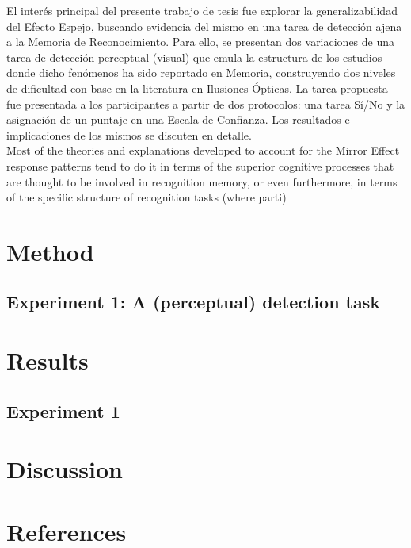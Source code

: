 \documentclass[jou,apacite]{apa6}
\begin{document}
El interés principal del presente trabajo de tesis fue explorar la generalizabilidad del Efecto Espejo, buscando evidencia del mismo en una tarea de detección ajena a la Memoria de Reconocimiento. Para ello, se presentan dos variaciones de una tarea de detección perceptual (visual) que emula la estructura de los estudios donde dicho fenómenos ha sido reportado en Memoria, construyendo dos niveles de dificultad con base en la literatura en Ilusiones Ópticas. La tarea propuesta fue presentada a los participantes a partir de dos protocolos: una tarea Sí/No y la asignación de un puntaje en una Escala de Confianza. Los resultados e implicaciones de los mismos se discuten en detalle.\\

Most of the theories and explanations developed to account for the Mirror Effect response patterns tend to do it in terms of the superior cognitive processes that are thought to be involved in recognition memory, or even furthermore, in terms of the specific structure of recognition tasks (where parti)


\section{Method}

\subsection{Experiment 1: A (perceptual) detection task}

\section{Results}

\subsection{Experiment 1}

\section{Discussion}



\section{References}
\end{document}
